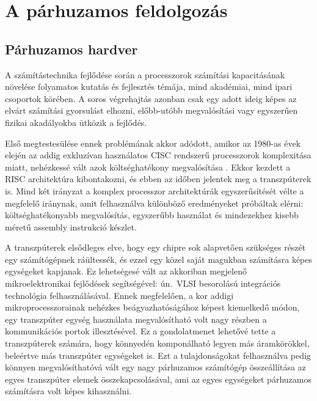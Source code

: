 \chapter{A párhuzamos feldolgozás}\label{ch:parallelism}


\section{Párhuzamos hardver}\label{sec:par-hw}

A számítástechnika fejlődése során a processzorok számítási kapacitásának növelése folyamatos kutatás és fejlesztés témája, mind akadémiai, mind ipari csoportok körében.
A soros végrehajtás azonban csak egy adott ideig képes az elvárt számítási gyorsulást elhozni, előbb-utóbb megvalósítási vagy egyszerűen fizikai akadályokba ütközik a fejlődés. 

Első megtestesülése ennek problémának akkor adódott, amikor az 1980-as évek elején az addig exkluzívan használatos CISC rendszerű processzorok komplexitása miatt, nehézkessé vált azok költséghatékony megvalósítása \cite{patterson_case_1980}.
Ekkor kezdett a RISC architektúra kibontakozni, és ebben az időben jelentek meg a transzpúterek is.
Mind két irányzat a komplex processzor architektúrák egyszerűsítését vélte a megfelelő iránynak, amit felhasználva különböző eredményeket próbáltak elérni: költséghatékonyabb megvalósítás, egyszerűbb használat és mindezekhez kisebb méretű assembly instrukció készlet.

A transzpúterek elsődleges elve, hogy egy chipre sok alapvetően szükséges részét egy számítógépnek ráültessék, és ezzel egy közel saját magukban számításra képes egységeket kapjanak.
Ez lehetségesé vált az akkoriban megjelenő mikroelektronikai fejlődések segítségével: ún.\ VLSI besorolású integrációs technológia felhasználásával.
Ennek megfelelően, a kor addigi mikroprocesszorainak nehézkes beágyazhatóságához képest \cite{clark_microprocessor_1978} kiemelkedő módon, egy transzpúter egység használata megvalósítható volt nagy részben a kommunikációs portok illesztésével.
Ez a gondolatmenet lehetővé tette a transzpúterek számára, hogy könnyedén komponálható legyen más áramkörökkel, beleértve más transzpúter egységeket is. 
Ezt a tulajdonságokat felhasználva pedig könnyen megvalósíthatóvá vált egy nagy párhuzamos számítógép összeállítása az egyes transzpúter elemek összekapcsolásával, ami az egyes egységeket párhuzamos számításra volt képes kihasználni.

